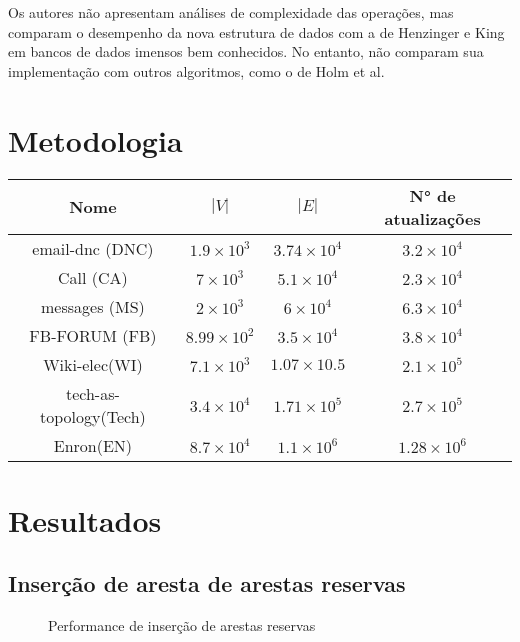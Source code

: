 Os autores não apresentam análises de complexidade das operações, mas comparam o desempenho da nova estrutura de dados com a de Henzinger e King em bancos de dados imensos bem conhecidos. No entanto, não comparam sua implementação com outros algoritmos, como o de Holm et al.



\section{Metodologia}
\begin{center}
\begin{tabular}{ |c|c|c|c| } 
 \hline
	Nome & $|V|$ & $|E|$ & N° de atualizações\\
 \hline
	email-dnc (DNC)\cite{nr-aaai15}&$1.9\times 10^3$&$3.74\times 10^4$&$3.2\times 10^4$\\
 \hline
	Call (CA)\cite{nr-aaai15}&$7\times 10^3$&$5.1\times 10^4$&$2.3\times 10^4$\\
 \hline
	messages (MS)\cite{nr-aaai15}&$2\times 10^3$&$6\times 10^4$&$6.3\times 10^4$\\
 \hline
	FB-FORUM (FB)\cite{nr-aaai15}&$8.99\times 10^2$&$3.5\times 10^4$&$3.8\times 10^4$\\
 \hline
	Wiki-elec(WI)\cite{nr-aaai15}&$7.1\times 10^3$&$1.07\times 10.5$&$2.1\times 10^5$\\
 \hline
	tech-as-topology(Tech)\cite{nr-aaai15}&$3.4\times 10^4$&$1.71\times 10^5$&$2.7\times 10^5$\\
 \hline
	Enron(EN)\cite{nr-aaai15}&$8.7\times 10^4$&$1.1\times 10^6$&$1.28\times 10^6$\\
 \hline
\end{tabular}
\end{center}


\section{Resultados}


\newpage

\subsection{Inserção de aresta de arestas reservas}
\legenda
\begin{figure}
\caption{Performance de inserção de arestas reservas}
\end{figure}



